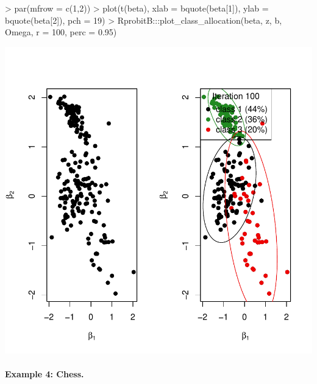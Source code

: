 \documentclass[article]{jss}
\begin{document}
\begin{Schunk}
\begin{Sinput}
> par(mfrow = c(1,2))
> plot(t(beta), xlab = bquote(beta[1]), ylab = bquote(beta[2]), pch = 19)
> RprobitB:::plot_class_allocation(beta, z, b, Omega, r = 100, perc = 0.95)
\end{Sinput}
\end{Schunk}
\includegraphics{rprobitb_oelschlaeger_bauer-dirichlet-example-plot}

\paragraph{Example 4: Chess.}
\end{document}
